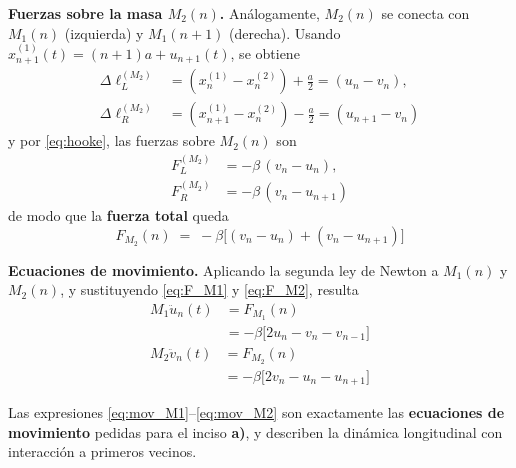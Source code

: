 \documentclass{article}
\begin{document}
\textcolor{Tarawera}{\textbf{Fuerzas sobre la masa \(M_{2}(n)\).}}
Análogamente, \(M_{2}(n)\) se conecta con \(M_{1}(n)\) (izquierda) y \(M_{1}(n+1)\) (derecha).
Usando \(x_{n+1}^{(1)}(t)= (n+1)a + u_{n+1}(t)\), se obtiene
\begin{equation}
\begin{split}
\Delta\ell^{(M_2)}_{L} &= (x_{n}^{(1)}-x_{n}^{(2)})+\tfrac{a}{2} = (u_{n}-v_{n}),\\
\Delta\ell^{(M_2)}_{R} &= (x_{n+1}^{(1)}-x_{n}^{(2)})-\tfrac{a}{2} = (u_{n+1}-v_{n})
\end{split}
\label{eq:elongaciones_M2}
\end{equation}
y por \eqref{eq:hooke}, las fuerzas sobre \(M_{2}(n)\) son
\begin{equation}
\begin{split}
F^{(M_2)}_{L} &= -\beta\,(v_{n}-u_{n}),\\
F^{(M_2)}_{R} &= -\beta\,(v_{n}-u_{n+1})
\end{split}
\label{eq:fuerzas_M2}
\end{equation}
de modo que la \textbf{fuerza total} queda
\begin{equation}
F_{M_{2}}(n) \;=\; -\beta\Big[(v_{n}-u_{n}) + (v_{n}-u_{n+1})\Big]
\label{eq:F_M2}
\end{equation}

\textcolor{trueblue}{\textbf{Ecuaciones de movimiento.}}
Aplicando la segunda ley de Newton a \(M_{1}(n)\) y \(M_{2}(n)\), y sustituyendo \eqref{eq:F_M1} y \eqref{eq:F_M2}, resulta
\begin{equation}
\begin{split}
M_{1}\ddot{u}_{n}(t) &= F_{M_{1}}(n)\\
                     &= -\beta\big[2u_{n}-v_{n}-v_{n-1}\big]
\end{split}
\label{eq:mov_M1}
\end{equation}
\begin{equation}
\begin{split}
M_{2}\ddot{v}_{n}(t) &= F_{M_{2}}(n)\\
                     &= -\beta\big[2v_{n}-u_{n}-u_{n+1}\big]
\end{split}
\label{eq:mov_M2}
\end{equation}

Las expresiones \eqref{eq:mov_M1}–\eqref{eq:mov_M2} son exactamente las \textbf{ecuaciones de movimiento} pedidas para el inciso \textbf{a)}, 
y describen la dinámica longitudinal con interacción a primeros vecinos.
\end{document}
